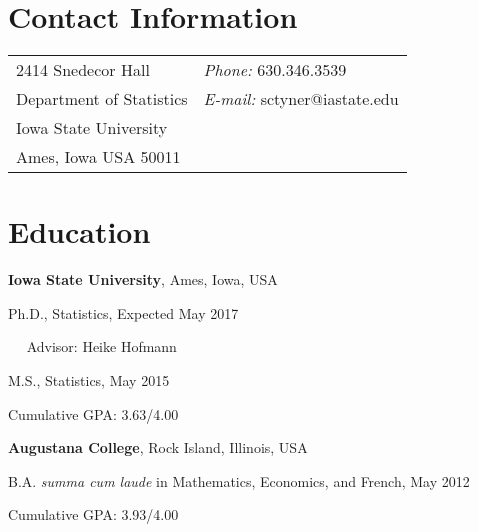 \documentclass[margin,line]{res}
\newenvironment{list1}{
  \begin{list}{\ding{113}}{%
      \setlength{\itemsep}{0in}
      \setlength{\parsep}{0in} \setlength{\parskip}{0in}
      \setlength{\topsep}{0in} \setlength{\partopsep}{0in} 
      \setlength{\leftmargin}{0.17in}}}{\end{list}}
\begin{document}

\begin{resume}
\section{\sc Contact Information}
\vspace{.05in}
\begin{tabular}{@{}p{2in}p{4in}}
2414 Snedecor Hall  & {\it Phone:}  630.346.3539 \\            
Department of Statistics  &  {\it E-mail:} sctyner@iastate.edu\\   
Iowa State University\\         
Ames, Iowa USA 50011 
\end{tabular}

\section{\sc Education}
{\bf Iowa State University}, Ames, Iowa, USA\\
\vspace*{-.1in}
\begin{list1}
\item[]Ph.D., Statistics, Expected May 2017 
\item[] $\quad$ Advisor: Heike Hofmann
\item[]M.S., Statistics, May 2015
\item[]Cumulative GPA: 3.63/4.00
\end{list1}
{\bf Augustana College}, Rock Island, Illinois, USA\\
\vspace*{-.1in}
\begin{list1}
\item[]B.A. \textit{summa cum laude} in Mathematics, Economics, and French, May 2012
\item[]Cumulative GPA: 3.93/4.00
\end{list1}


\end{resume}
\end{document}
